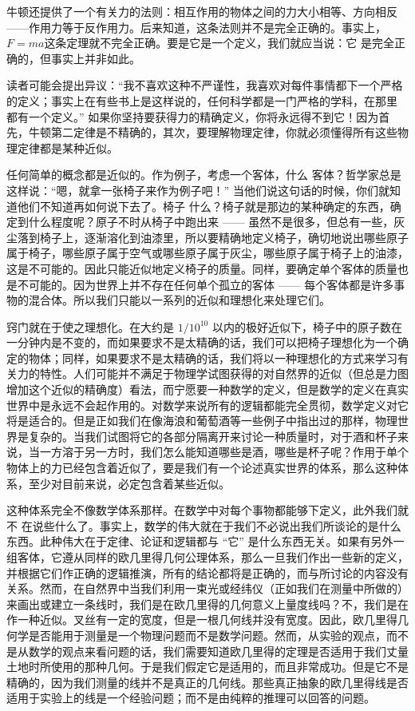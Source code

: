 \documentclass[12pt,oneside]{book}
\begin{document}
牛顿还提供了一个有关力的法则：相互作用的物体之间的力大小相等、方向相反——作用力等于反作用力。后来知道，这条法则并不是完全正确的。事实上，$F=ma$这条定理就不完全正确。要是它是一个定义，我们就应当说：它  是完全正确的，但事实上并非如此。


读者可能会提出异议：“我不喜欢这种不严谨性，我喜欢对每件事情都下一个严格的定义；事实上在有些书上是这样说的，任何科学都是一门严格的学科，在那里  都有一个定义。” 如果你坚持要获得力的精确定义，你将永远得不到它！因为首先，牛顿第二定律是不精确的，其次，要理解物理定律，你就必须懂得所有这些物理定律都是某种近似。


任何简单的概念都是近似的。作为例子，考虑一个客体，什么  客体？哲学家总是这样说：“嗯，就拿一张椅子来作为例子吧！” 当他们说这句话的时候，你们就知道他们不知道再如何说下去了。椅子  什么？椅子就是那边的某种确定的东西，确定到什么程度呢？原子不时从椅子中跑出来 —— 虽然不是很多，但总有一些，灰尘落到椅子上，逐渐溶化到油漆里，所以要精确地定义椅子，确切地说出哪些原子属于椅子，哪些原子属于空气或哪些原子属于灰尘，哪些原子属于椅子上的油漆，这是不可能的。因此只能近似地定义椅子的质量。同样，要确定单个客体的质量也是不可能的。因为世界上并不存在任何单个孤立的客体 —— 每个客体都是许多事物的混合体。所以我们只能以一系列的近似和理想化来处理它们。


窍门就在于使之理想化。在大约是 $ 1/10^{10} $ 以内的极好近似下，椅子中的原子数在一分钟内是不变的，而如果要求不是太精确的话，我们可以把椅子理想化为一个确定的物体；同样，如果要求不是太精确的话，我们将以一种理想化的方式来学习有关力的特性。人们可能并不满足于物理学试图获得的对自然界的近似（但总是力图增加这个近似的精确度）看法，而宁愿要一种数学的定义，但是数学的定义在真实世界中是永远不会起作用的。对数学来说所有的逻辑都能完全贯彻，数学定义对它将是适合的。但是正如我们在像海浪和葡萄酒等一些例子中指出过的那样，物理世界是复杂的。当我们试图将它的各部分隔离开来讨论一种质量时，对于酒和杯子来说，当一方溶于另一方时，我们怎么能知道哪些是酒，哪些是杯子呢？作用于单个物体上的力已经包含着近似了，要是我们有一个论述真实世界的体系，那么这种体系，至少对目前来说，必定包含着某些近似。


这种体系完全不像数学体系那样。在数学中对每个事物都能够下定义，此外我们就不  在说些什么了。事实上，数学的伟大就在于我们不必说出我们所谈论的是什么东西。此种伟大在于定律、论证和逻辑都与 “它” 是什么东西无关。如果有另外一组客体，它遵从同样的欧几里得几何公理体系，那么一旦我们作出一些新的定义，并根据它们作正确的逻辑推演，所有的结论都将是正确的，而与所讨论的内容没有关系。然而，在自然界中当我们利用一束光或经纬仪（正如我们在测量中所做的）来画出或建立一条线时，我们是在欧几里得的几何意义上量度线吗？不，我们是在作一种近似。叉丝有一定的宽度，但是一根几何线并没有宽度。因此，欧几里得几何学是否能用于测量是一个物理问题而不是数学问题。然而，从实验的观点，而不是从数学的观点来看问题的话，我们需要知道欧几里得的定理是否适用于我们丈量土地时所使用的那种几何。于是我们假定它是适用的，而且非常成功。但是它不是精确的，因为我们测量的线并不是真正的几何线。那些真正抽象的欧几里得线是否适用于实验上的线是一个经验问题；而不是由纯粹的推理可以回答的问题。
\end{document}
